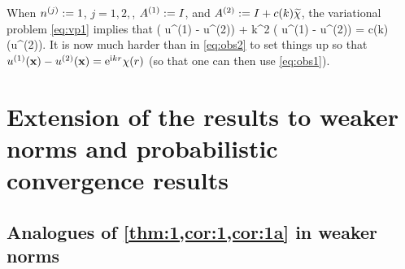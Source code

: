 When $n^{(j)}:=1$, $j=1,2,$, ${A}^{(1)}:=I$, and ${A}^{(2)}:= I + c(k)\widetilde{\chi}$, the variational problem \cref{eq:vp1} implies that 
\beqs%
\Delta \big( u^{(1)} - u^{(2)}\big) + k^2 \big( u^{(1)} - u^{(2)}\big) = c(k)\nabla\cdot \big(\widetilde{\chi}\nabla u^{(2)}\big).
\eeqs
It is now much harder than in \cref{eq:obs2} to set things up so that $ u^{(1)}(\mathbf{x}) - u^{(2)}(\mathbf{x})=\mathrm{e}^{\mathrm{i} kr}\chi(r)$ (so that one can then use \cref{eq:obs1}).
\ere


\section[Extensions: Weaker norms and probabalistic results]{Extension of the results to weaker norms and probabilistic convergence results}
\subsection{Analogues of \cref{thm:1,cor:1,cor:1a} in weaker norms}\label{sec:weaknorm}

